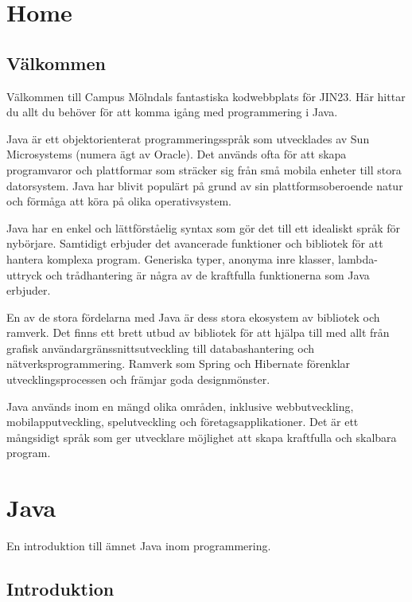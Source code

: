 \hypertarget{home}{%
\section{Home}\label{home}}

\hypertarget{vuxe4lkommen}{%
\subsection{Välkommen}\label{vuxe4lkommen}}

Välkommen till Campus Mölndals fantastiska kodwebbplats för JIN23. Här
hittar du allt du behöver för att komma igång med programmering i Java.

Java är ett objektorienterat programmeringsspråk som utvecklades av Sun
Microsystems (numera ägt av Oracle). Det används ofta för att skapa
programvaror och plattformar som sträcker sig från små mobila enheter
till stora datorsystem. Java har blivit populärt på grund av sin
plattformsoberoende natur och förmåga att köra på olika operativsystem.

Java har en enkel och lättförståelig syntax som gör det till ett
idealiskt språk för nybörjare. Samtidigt erbjuder det avancerade
funktioner och bibliotek för att hantera komplexa program. Generiska
typer, anonyma inre klasser, lambda-uttryck och trådhantering är några
av de kraftfulla funktionerna som Java erbjuder.

En av de stora fördelarna med Java är dess stora ekosystem av bibliotek
och ramverk. Det finns ett brett utbud av bibliotek för att hjälpa till
med allt från grafisk användargränssnittsutveckling till
databashantering och nätverksprogrammering. Ramverk som Spring och
Hibernate förenklar utvecklingsprocessen och främjar goda designmönster.

Java används inom en mängd olika områden, inklusive webbutveckling,
mobilapputveckling, spelutveckling och företagsapplikationer. Det är ett
mångsidigt språk som ger utvecklare möjlighet att skapa kraftfulla och
skalbara program.

\hypertarget{java}{%
\section{Java}\label{java}}

En introduktion till ämnet Java inom programmering.

\hypertarget{introduktion}{%
\subsection{Introduktion}\label{introduktion}}

